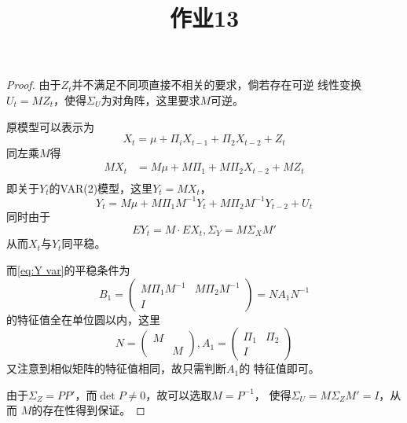 \documentclass[cn]{homework}
\title{作业13}
\begin{document}
    \maketitle

    \problem
    \begin{subproblem}[(\alph*)]
        \item
        \begin{proof}
            由于$Z_t$并不满足不同项直接不相关的要求，倘若存在可逆
            线性变换$U_t=MZ_t$，使得$\Sigma_U$为对角阵，这里要求$M$可逆。

            原模型可以表示为
            \begin{equation}
                \label{eq:X var}
                X_t=\mu+\Pi_iX_{t-1}+\Pi_2X_{t-2}+Z_t
            \end{equation}
            同左乘$M$得
            \[\begin{aligned}
                MX_t&=M\mu+M\Pi_1+M\Pi_2X_{t-2}+MZ_t\\
            \end{aligned}\]
            即关于$Y_t$的VAR(2)模型，这里$Y_t=MX_t$，
            \begin{equation}
                \label{eq:Y var}
                Y_t=M\mu+M\Pi_1M^{-1}Y_t+M\Pi_2M^{-1}Y_{t-2}+U_t
            \end{equation}
            同时由于
            \[EY_t=M\cdot EX_t,\Sigma_Y=M\Sigma_XM'\]
            从而$X_t$与$Y_t$同平稳。

            而\cref{eq:Y var}的平稳条件为
            \[B_1=\begin{pmatrix}
                M\Pi_1 M^{-1} & M\Pi_2 M^{-1} \\
                I &
            \end{pmatrix}
            =NA_1N^{-1}\]
            的特征值全在单位圆以内，这里
            \[N=\begin{pmatrix}
                M & \\
                  & M
            \end{pmatrix},
            A_1=\begin{pmatrix}
                \Pi_1 & \Pi_2 \\
                I
            \end{pmatrix}\]
            又注意到相似矩阵的特征值相同，故只需判断$A_1$的
            特征值即可。

            由于$\Sigma_{Z}=PP'$，而$\det P\neq 0$，故可以选取$M=P^{-1}$，
            使得$\Sigma_{U}=M\Sigma_{Z}M'=I$，从而
            $M$的存在性得到保证。
        

\end{proof}
\end{subproblem}
\end{document}
